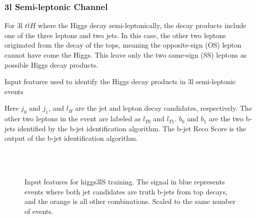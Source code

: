 
\subsubsection{3l Semi-leptonic Channel}
\label{subsec:higgs3lS}

For 3l $t\bar{t}H$ where the Higgs decay semi-leptonically, the decay products include one of the three leptons and two jets. In this case, the other two leptons originated from the decay of the tops, meaning the opposite-sign (OS) lepton cannot have come the Higgs. This leave only the two same-sign (SS) leptons as possible Higgs decay products. 

\begin{table}[H]

  \caption{Input features used to identify the Higgs decay products in 3l semi-leptonic events}
  \label{tab:higgsTop3lSfeatures}
\end{table}

Here $j_0$ and $j_1$, and $l_H$ are the jet and lepton decay candidates, respectively. The other two leptons in the event are labeled as $l_{T0}$ and $l_{T1}$. $b_0$ and $b_1$ are the two b-jets identified by the b-jet identification algorithm. The b-jet Reco Score is the output of the b-jet identification algorithm. 

\begin{figure}[H]
    \centering
    \\
    \\
    \caption{Input features for higgs3lS training. The signal in blue represents events where both jet candidates are truth b-jets from top decays, and the orange is all other combinations. Scaled to the same number of events.}
    \label{fig:features_higgs3lS}
\end{figure}

